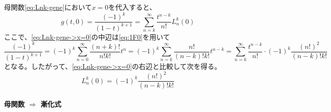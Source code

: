 \documentclass[../main/main]{subfiles}
\begin{document}
母関数\eqref{eq:Lnk-gene}において$x=0$を代入すると、
\begin{equation}\label{eq:Lnk-gene->x=0}
   g(t, 0) 
	= \frac{(-1)^k}{(1-t)^{k+1}} 
	= \sum_{n=k}^\infty \frac{t^{n-k}}{n!} L_n^k(0)
\end{equation}
ここで、\eqref{eq:Lnk-gene->x=0}の中辺は\eqref{eq:1F0}を用いて
\begin{equation*}
  \frac{(-1)^k}{(1-t)^{k+1}}  
	= (-1)^k \sum_{n=0}^\infty \frac{(n+k)!}{n! k!} t^n
	= (-1)^k \sum_{n=k}^\infty \frac{n!}{(n-k)! k!} t^{n-k}
	= \sum_{n=k}^\infty \frac{t^{n-k}}{n!} \cdot (-1)^k \frac{(n!)^2}{(n-k)! k!}
\end{equation*}
となる。したがって、\eqref{eq:Lnk-gene->x=0}の右辺と比較して次を得る。
\begin{equation*}
  L_n^k(0) = (-1)^k \frac{(n!)^2}{(n-k)! k!}
\end{equation*}

\paragraph{母関数 $\Longrightarrow$ 漸化式}
\end{document}
